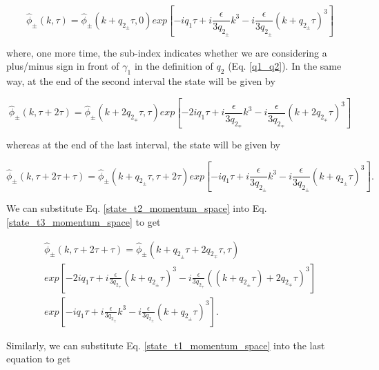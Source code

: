 \documentclass{article}
\begin{document}
\begin{equation}\label{state_t1_momentum_space}
\widehat{\phi}_{\pm}(k, \tau) = \widehat{\phi}_{\pm}(k + q_{2_{\pm}}\tau, 0) exp\left[-i q_{1} \tau + i \frac{\epsilon}{3q_{2_{\pm}}} k^{3} - i \frac{\epsilon}{3q_{2_{\pm}}} (k + q_{2_{\pm}} \tau)^{3} \right]
\end{equation}

where, one more time, the sub-index indicates whether we are considering a plus/minus sign in front of $\gamma_{1}$ in the definition of $q_{2}$ (Eq. \ref{q1_q2}). In the same way, at the end of the second interval the state will be given by

\begin{equation}\label{state_t2_momentum_space}
\widehat{\phi}_{\pm}(k, \tau+2\tau) = \widehat{\phi}_{\pm}(k + 2q_{2_{\mp}}\tau, \tau) exp\left[-2i q_{1} \tau + i \frac{\epsilon}{3q_{2_{\mp}}} k^{3} - i \frac{\epsilon}{3q_{2_{\mp}}} (k + 2q_{2_{\mp}} \tau)^{3} \right]
\end{equation}

whereas at the end of the last interval, the state will be given by

\begin{equation}\label{state_t3_momentum_space}
\widehat{\phi}_{\pm}(k, \tau+2\tau+\tau) = \widehat{\phi}_{\pm}(k + q_{2_{\pm}}\tau, \tau+2\tau) exp\left[-i q_{1} \tau + i \frac{\epsilon}{3q_{2_{\pm}}} k^{3} - i \frac{\epsilon}{3q_{2_{\pm}}} (k + q_{2_{\pm}} \tau)^{3} \right].
\end{equation}

We can substitute Eq. \ref{state_t2_momentum_space} into Eq. \ref{state_t3_momentum_space} to get

\begin{multline}\label{state_t3_momentum_space_2}
\widehat{\phi}_{\pm}(k, \tau+2\tau+\tau) = \widehat{\phi}_{\pm}(k + q_{2_{\pm}}\tau + 2q_{2_{\mp}}\tau, \tau)  \\ 
exp\left[-2i q_{1} \tau + i \frac{\epsilon}{3q_{2_{\mp}}} (k+q_{2_{\pm}}\tau)^{3} - i \frac{\epsilon}{3q_{2_{\mp}}} ((k+ q_{2_{\pm}}\tau) + 2q_{2_{\mp}} \tau)^{3} \right] \\
exp\left[-i q_{1} \tau + i \frac{\epsilon}{3q_{2_{\pm}}} k^{3} - i \frac{\epsilon}{3q_{2_{\pm}}} (k + q_{2_{\pm}} \tau)^{3} \right].
\end{multline}

Similarly, we can substitute Eq. \ref{state_t1_momentum_space} into the last equation to get
\end{document}

